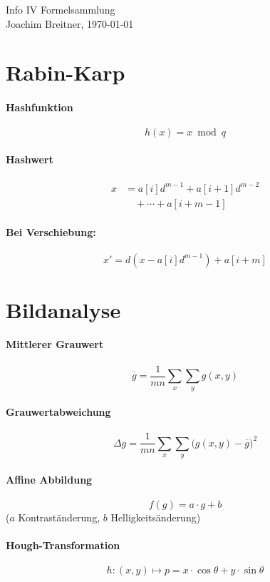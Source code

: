 \documentclass{scrartcl}
\begin{document}
\pagestyle{empty}
\begin{center}
\sectfont \LARGE Info IV Formelsammlung\\
\normalfont \normalsize Joachim Breitner, \today
\end{center}
\begin{flushleft}
\begin{multicols}{2}
\section{Rabin-Karp}
\paragraph{Hashfunktion}
\[ h(x) = x \bmod q \]
\paragraph{Hashwert}
\begin{align*}
x &= a[i]d^{m-1} + a[i+1]d^{m-2} \\
    &\quad + \cdots + a[i+m-1]
\end{align*}
\paragraph{Bei Verschiebung:}
\[ x' = d(x-a[i]d^{m-1}) + a[i+m] \]

\section{Bildanalyse}
\paragraph{Mittlerer Grauwert}
\[ \overline{g} = \frac{1}{mn} \sum_x \sum_y g(x,y)\]
\paragraph{Grauwertabweichung}
\[ \Delta g = \frac{1}{mn} \sum_x \sum_y \big(g(x,y) - \overline g\big)^2 \]
\paragraph{Affine Abbildung}
\[ f(g) = a\cdot g + b \]
($a$ Kontraständerung, $b$ Helligkeitsänderung)
\paragraph{Hough-Transformation}
\[ h:(x,y) \mapsto p = x\cdot \cos \theta + y \cdot \sin \theta \]


\end{multicols}
\end{flushleft}
\end{document}
